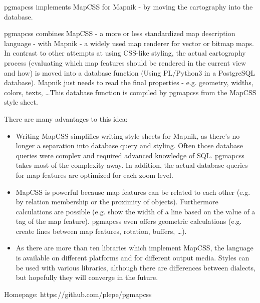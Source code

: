 %
{pgmapcss implements MapCSS for Mapnik - by moving the cartography into the database.}%
{}%
{pgmapcss combines MapCSS - a more or less standardized map description language - with Mapnik - a widely used map renderer for vector or bitmap maps. In contrast to other attempts at using CSS-like styling, the actual cartography process (evaluating which map features should be rendered  in the current view and how) is moved into a database function (Using PL/Python3 in a PostgreSQL database). Mapnik just needs to read the final properties - e.g. geometry, widths, colors, texts, \dots This database function is compiled by pgmapcss from the MapCSS style sheet.

\noindent There are many advantages to this idea:
\begin{itemize}
\item Writing MapCSS simplifies writing style sheets for Mapnik, as there's no longer a separation into database query and styling. Often those database queries were complex and required advanced knowledge of SQL. pgmapcss takes most of the complexity away. In addition, the actual database queries for map features are optimized for each zoom level.
\item MapCSS is powerful because map features can be related to each other (e.g. by relation membership or the proximity of objects). Furthermore calculations are possible (e.g. show the width of a line based on the value of a tag of the map feature). pgmapcss even offers geometric calculations (e.g. create lines between map features, rotation, buffers, …).
\item As there are more than ten libraries which implement MapCSS, the language is available on different platforms and for different output media. Styles can be used with various libraries,  although there are differences between dialects, but hopefully they will converge in the future.
\end{itemize}

Homepage: https://github.com/plepe/pgmapcss}

\ClearWallPaper

\cropmarkswallpaper

